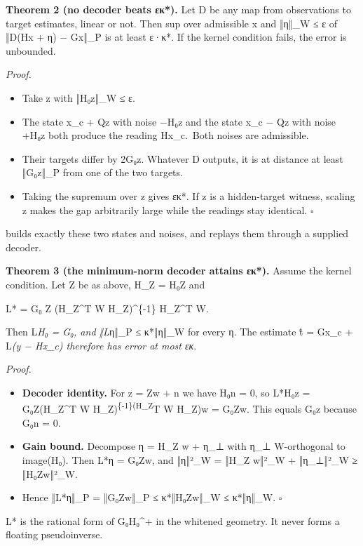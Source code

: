 \documentclass[
  11pt,
  a4paper,
]{report}
\providecommand{\tightlist}{%
  \setlength{\itemsep}{0pt}\setlength{\parskip}{0pt}}
\let\singularitytexttt\texttt
\renewcommand{\texttt}[1]{\singularitytexttt{\seqsplit{#1}}}
\begin{document}
\textbf{Theorem 2 (no decoder beats εκ*).} Let D be any map from
observations to target estimates, linear or not. Then sup over
admissible x and ‖η‖\_W ≤ ε of ‖D(Hx + η) − Gx‖\_P is at least ε·κ*. If
the kernel condition fails, the error is unbounded.

\emph{Proof.}

\begin{itemize}
\tightlist
\item
  Take z with ‖H₀z‖\_W ≤ ε.
\item
  The state x\_c + Qz with noise −H₀z and the state x\_c − Qz with noise
  +H₀z both produce the reading Hx\_c.~Both noises are admissible.
\item
  Their targets differ by 2G₀z. Whatever D outputs, it is at distance at
  least ‖G₀z‖\_P from one of the two targets.
\item
  Taking the supremum over z gives εκ*. If z is a hidden-target witness,
  scaling z makes the gap arbitrarily large while the readings stay
  identical. \(\square\)
\end{itemize}

\texttt{adversarial\_witness} builds exactly these two states and
noises, and replays them through a supplied decoder.

\textbf{Theorem 3 (the minimum-norm decoder attains εκ*).} Assume the
kernel condition. Let Z be as above, H\_Z = H₀Z and

L* = G₀ Z (H\_Z\textasciicircum{}T W H\_Z)\textasciicircum{}\{-1\} H\_Z\textasciicircum{}T W.

Then L\emph{H₀ = G₀, and ‖L}η‖\_P ≤ κ*‖η‖\_W for every η. The estimate t̂
= Gx\_c + L\emph{(y − Hx\_c) therefore has error at most εκ}.

\emph{Proof.}

\begin{itemize}
\tightlist
\item
  \textbf{Decoder identity.} For z = Zw + n we have H₀n = 0, so L*H₀z =
  G₀Z(H\_Z\textasciicircum{}T W H\_Z)\textsuperscript{\{-1\}(H\_Z}T W H\_Z)w = G₀Zw.
  This equals G₀z because G₀n = 0.
\item
  \textbf{Gain bound.} Decompose η = H\_Z w + η\_⊥ with η\_⊥
  W-orthogonal to image(H₀). Then L*η = G₀Zw, and ‖η‖²\_W = ‖H\_Z w‖²\_W
  + ‖η\_⊥‖²\_W ≥ ‖H₀Zw‖²\_W.
\item
  Hence ‖L*η‖\_P = ‖G₀Zw‖\_P ≤ κ*‖H₀Zw‖\_W ≤ κ*‖η‖\_W. \(\square\)
\end{itemize}

L* is the rational form of G₀H₀\textasciicircum{}+ in the whitened geometry. It never
forms a floating pseudoinverse.
\end{document}
